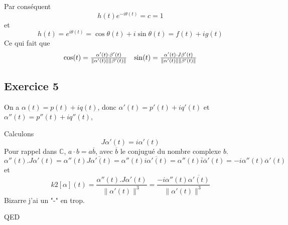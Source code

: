 \documentclass[]{book}
\theoremstyle{definition}
\newcommand{\bb}[1]{\mathbb{#1}}
\newcommand{\C}{\bb{C}}
\begin{document}
Par cons\'equent 
$$
h(t)e^{-i\theta(t)} = c = 1
$$
et
$$
h(t)= e^{i\theta(t)} = \cos \theta(t) + i \sin \theta(t) = f(t) + ig(t)
$$
Ce qui fait que 
$$
\begin{array}{l l}
\cos(t) = \frac{\alpha'(t) \cdot \beta'(t)}{\lVert \alpha'(t) \rVert \lVert \beta'(t) \lVert} & \sin(t) = \frac{\alpha'(t) \cdot J\beta'(t)}{\lVert \alpha'(t) \rVert \lVert \beta'(t) \lVert}
\end{array}
$$



\subsection*{Exercice 5}
On a  $\alpha(t) = p(t) + iq(t)$, donc $\alpha'(t) = p'(t) + iq'(t)$ et $\alpha''(t) = p''(t) + iq''(t)$,

Calculons
$$
J\alpha'(t) = i\alpha'(t)
$$
Pour rappel dans $\C$, $a \cdot b = a \overline{b}$, avec $\overline{b}$ le conjugu\'e du nombre complexe $b$.
$$
\alpha''(t).J\alpha'(t) = \alpha''(t)\overline{J\alpha'(t)} = \alpha''(t)\overline{i\alpha'(t)} = \alpha''(t)\overline{i}\overline{\alpha}'(t) = -i\alpha''(t)\overline{\alpha}'(t)  
$$
et 
$$
k2[\alpha](t) = \frac{\alpha''(t).J\alpha'(t)}{\lVert \alpha'(t) \rVert^3} = \frac{-i\alpha''(t)\overline{\alpha'(t)}}{\lVert \alpha'(t) \rVert^3}
$$
Bizarre j'ai un "-" en trop.

QED
\end{document}
